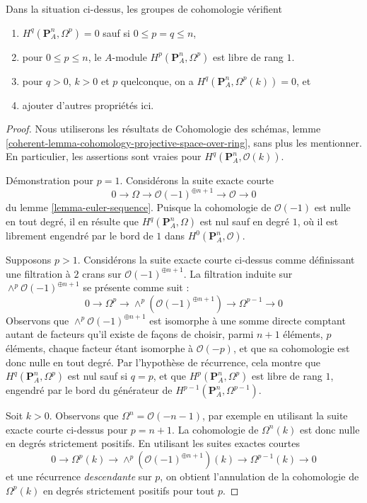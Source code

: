 \begin{lemma}
\label{lemma-twisted-hodge-cohomology-projective-space}
Dans la situation ci-dessus, les groupes de cohomologie vérifient
\begin{enumerate}
\item $H^q(\mathbf{P}^n_A, \Omega^p) = 0$
sauf si $0 \leq p = q \leq n$,
\item pour $0 \leq p \leq n$, le $A$-module
$H^p(\mathbf{P}^n_A, \Omega^p)$ est libre de rang $1$.
\item pour $q > 0$, $k > 0$ et $p$ quelconque, on a
$H^q(\mathbf{P}^n_A, \Omega^p(k)) = 0$, et
\item ajouter d'autres propriétés ici.
\end{enumerate}
\end{lemma}

\begin{proof}
Nous utiliserons les résultats de Cohomologie des schémas, lemme
\ref{coherent-lemma-cohomology-projective-space-over-ring},
sans plus les mentionner. En particulier, les assertions sont vraies
pour $H^q(\mathbf{P}^n_A, \mathcal{O}(k))$.

\medskip\noindent
Démonstration pour $p = 1$. Considérons la suite exacte courte
$$
0 \to \Omega \to \mathcal{O}(-1)^{\oplus n + 1} \to \mathcal{O} \to 0
$$
du lemme \ref{lemma-euler-sequence}. Puisque la cohomologie de $\mathcal{O}(-1)$
est nulle en tout degré, il en résulte que
$H^q(\mathbf{P}^n_A, \Omega)$ est nul sauf en degré $1$,
où il est librement engendré par le bord de $1$ dans
$H^0(\mathbf{P}^n_A, \mathcal{O})$.

\medskip\noindent
Supposons $p > 1$. Considérons la suite exacte courte
ci-dessus comme définissant une filtration à $2$ crans sur $\mathcal{O}(-1)^{\oplus n + 1}$.
La filtration induite sur $\wedge^p\mathcal{O}(-1)^{\oplus n + 1}$ se présente
comme suit :
$$
0 \to \Omega^p \to \wedge^p\left(\mathcal{O}(-1)^{\oplus n + 1}\right)
\to \Omega^{p - 1} \to 0
$$
Observons que $\wedge^p\mathcal{O}(-1)^{\oplus n + 1}$ est isomorphe
à une somme directe comptant autant de facteurs qu'il existe de façons de
choisir, parmi $n + 1$ éléments, $p$ éléments, chaque facteur étant
isomorphe à $\mathcal{O}(-p)$,
et que sa cohomologie est donc nulle en tout degré.
Par l'hypothèse de récurrence, cela montre que $H^q(\mathbf{P}^n_A, \Omega^p)$
est nul sauf si $q = p$, et que $H^p(\mathbf{P}^n_A, \Omega^p)$ est libre
de rang $1$, engendré par le bord du générateur de
$H^{p - 1}(\mathbf{P}^n_A, \Omega^{p - 1})$.

\medskip\noindent
Soit $k > 0$. Observons que $\Omega^n = \mathcal{O}(-n - 1)$, par exemple
en utilisant la suite exacte courte ci-dessus pour $p = n + 1$.
La cohomologie de $\Omega^n(k)$ est donc nulle en degrés strictement positifs.
En utilisant les suites exactes courtes
$$
0 \to \Omega^p(k) \to \wedge^p\left(\mathcal{O}(-1)^{\oplus n + 1}\right)(k)
\to \Omega^{p - 1}(k) \to 0
$$
et une récurrence {\it descendante} sur $p$, on obtient l'annulation de la
cohomologie de $\Omega^p(k)$ en degrés strictement positifs pour tout $p$.
\end{proof}

